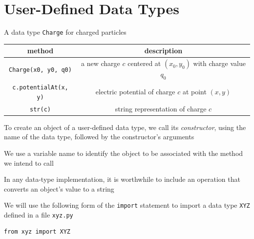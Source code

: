 \documentclass[8pt,a4paper,compress,handout]{beamer}
\begin{document}
\section{User-Defined Data Types}
\begin{frame}[fragile]
A data type \lstinline{Charge} for charged particles
\begin{center}
\begin{tabular}{cc}
method & description \\ \hline
\lstinline$Charge(x0, y0, q0)$ & a new charge $c$ centered at $(x_0, y_0)$ with charge value $q_0$ \\
\lstinline$c.potentialAt(x, y)$ & electric potential of charge $c$ at point $(x, y)$ \\
\lstinline$str(c)$ & string representation of charge $c$
\end{tabular} 
\end{center}

\bigskip

To create an object of a user-defined data type, we call its \emph{constructor}, using the name of the data type, followed by the constructor's arguments

\bigskip

We use a variable name to identify the object to be associated with the method we intend to call

\bigskip

In any data-type implementation, it is worthwhile to include an operation that converts an object's value to a string

\bigskip

We will use the following form of the \lstinline{import} statement to import a data type \lstinline{XYZ} defined in a file \lstinline{xyz.py}
\begin{lstlisting}[language={}]
from xyz import XYZ
\end{lstlisting}
\end{frame}
\end{document}
